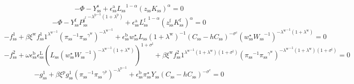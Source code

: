 \begin{equation}
-\Phi - Y^{\mathrm{s}}_\mathrm{ss} + {\epsilon^{\mathrm{a}}_\mathrm{ss}} {{L_\mathrm{ss}}^{1 - \alpha}} {\left({z_\mathrm{ss}} {K_\mathrm{ss}}\right)^{\alpha}} = 0
\end{equation}
\begin{equation}
-\Phi - {Y^{\mathrm{f}}_\mathrm{ss}} {{P^{\mathrm{j}^{\mathrm{f}}}_\mathrm{ss}}^{-{\lambda^{\mathrm{p}}}^{-1} \left(1 + \lambda^{\mathrm{p}}\right)}} + {\epsilon^{\mathrm{a}}_\mathrm{ss}} {{L^{\mathrm{f}}_\mathrm{ss}}^{1 - \alpha}} {\left({z^{\mathrm{f}}_\mathrm{ss}} {K^{\mathrm{f}}_\mathrm{ss}}\right)^{\alpha}} = 0
\end{equation}
\begin{equation}
-f^{\mathrm{1}}_\mathrm{ss} + {\beta} {\xi^{\mathrm{w}}} {f^{\mathrm{1}}_\mathrm{ss}} {{1}^{{\lambda^{\mathrm{w}}}^{-1}}} {\left({\pi_\mathrm{ss}}^{-1} {{\pi_\mathrm{ss}}^{\gamma^{\mathrm{w}}}}\right)^{-{\lambda^{\mathrm{w}}}^{-1}}} + {\epsilon^{\mathrm{b}}_\mathrm{ss}} {w^{\star}_\mathrm{ss}} {L_\mathrm{ss}} \left(1 + \lambda^{\mathrm{w}}\right)^{-1} {\left(C_\mathrm{ss} - {h} {C_\mathrm{ss}}\right)^{-\sigma^{\mathrm{c}}}} {\left({w^{\star}_\mathrm{ss}} {W_\mathrm{ss}}^{-1}\right)^{-{\lambda^{\mathrm{w}}}^{-1} \left(1 + \lambda^{\mathrm{w}}\right)}} = 0
\end{equation}
\begin{equation}
-f^{\mathrm{2}}_\mathrm{ss} + {\omega} {\epsilon^{\mathrm{b}}_\mathrm{ss}} {\epsilon^{\mathrm{L}}_\mathrm{ss}} {\left({L_\mathrm{ss}} {\left({w^{\star}_\mathrm{ss}} {W_\mathrm{ss}}^{-1}\right)^{-{\lambda^{\mathrm{w}}}^{-1} \left(1 + \lambda^{\mathrm{w}}\right)}}\right)^{1 + \sigma^{\mathrm{l}}}} + {\beta} {\xi^{\mathrm{w}}} {f^{\mathrm{2}}_\mathrm{ss}} {{1}^{{\lambda^{\mathrm{w}}}^{-1} \left(1 + \lambda^{\mathrm{w}}\right) \left(1 + \sigma^{\mathrm{l}}\right)}} {\left({\pi_\mathrm{ss}}^{-1} {{\pi_\mathrm{ss}}^{\gamma^{\mathrm{w}}}}\right)^{-{\lambda^{\mathrm{w}}}^{-1} \left(1 + \lambda^{\mathrm{w}}\right) \left(1 + \sigma^{\mathrm{l}}\right)}} = 0
\end{equation}
\begin{equation}
-g^{\mathrm{1}}_\mathrm{ss} + {\beta} {\xi^{\mathrm{p}}} {g^{\mathrm{1}}_\mathrm{ss}} {\left({\pi_\mathrm{ss}}^{-1} {{\pi_\mathrm{ss}}^{\gamma^{\mathrm{p}}}}\right)^{-{\lambda^{\mathrm{p}}}^{-1}}} + {\epsilon^{\mathrm{b}}_\mathrm{ss}} {\pi^{\star}_\mathrm{ss}} {Y_\mathrm{ss}} {\left(C_\mathrm{ss} - {h} {C_\mathrm{ss}}\right)^{-\sigma^{\mathrm{c}}}} = 0
\end{equation}
